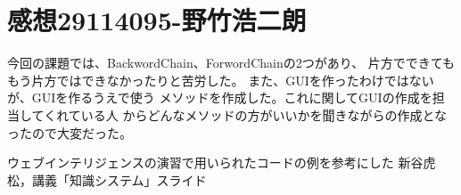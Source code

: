 \documentclass{jarticle}
\begin{document}
\section{感想29114095-野竹浩二朗}
今回の課題では、BackwordChain、ForwordChainの2つがあり、
片方でできてももう片方ではできなかったりと苦労した。
また、GUIを作ったわけではないが、GUIを作るうえで使う
メソッドを作成した。これに関してGUIの作成を担当してくれている人
からどんなメソッドの方がいいかを聞きながらの作成となったので大変だった。

\begin{thebibliography}{99}
     ウェブインテリジェンスの演習で用いられたコードの例を参考にした
     新谷虎松，講義「知識システム」スライド
\end{thebibliography}
\end{document}
